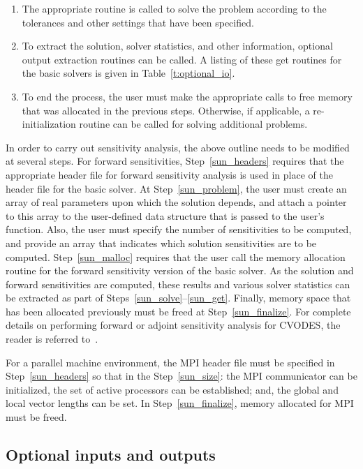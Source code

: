 \begin{enumerate}
\item \label{sun_solve}
The appropriate routine is called to solve the problem according to
the tolerances and other settings that have been specified.

\item \label{sun_get}
To extract the solution, solver statistics, and other information,
optional output extraction routines can be called. A listing of these
get routines for the basic solvers is given in Table~\ref{t:optional_io}.

\item \label{sun_finalize}
To end the process, the user must make the appropriate calls to
free memory that was allocated in the previous steps. Otherwise, if
applicable, a re-initialization routine can be called for solving
additional problems.

\end{enumerate}

In order to carry out sensitivity analysis, the above outline
needs to be modified at several steps. For forward sensitivities,
Step~\ref{sun_headers} requires that the appropriate header
file for forward sensitivity analysis is used in place of the header
file for the basic solver. At Step~\ref{sun_problem}, the user must
create an array of real parameters upon which the solution depends,
and attach a pointer to this array to the user-defined data structure
that is passed to the user's function. Also, the user must specify the
number of sensitivities to be computed, and provide an array that
indicates which solution sensitivities are to be
computed. Step~\ref{sun_malloc} requires that the user call the memory
allocation routine for the forward sensitivity version of the basic
solver. As the solution and forward sensitivities are computed,
these results and various solver statistics can be extracted as part
of Steps~\ref{sun_solve}--\ref{sun_get}. Finally, memory space that
has been allocated previously must be freed at
Step~\ref{sun_finalize}. For complete details on performing forward or
adjoint sensitivity analysis for CVODES, the reader is referred to~\cite{SeHi:03}.

For a parallel machine environment, the MPI header file must be
specified in Step~\ref{sun_headers} so that in the Step~\ref{sun_size}: the MPI
communicator can be initialized, the set of active processors can be
established; and, the global and local vector lengths can be set.
In Step~\ref{sun_finalize}, memory allocated for MPI must be freed.

\subsection{Optional inputs and outputs}\label{ss:optional_io}

